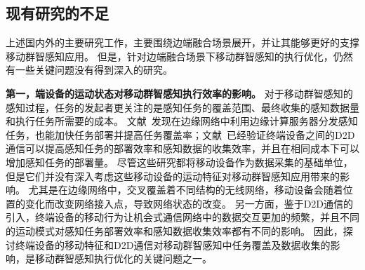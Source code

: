 

\subsection{现有研究的不足}


上述国内外的主要研究工作，主要围绕边端融合场景展开，并让其能够更好的支撑移动群智感知应用。
但是，针对边端融合场景下移动群智感知的执行优化，仍然有一些关键问题没有得到深入的研究。


\textbf{第一，端设备的运动状态对移动群智感知执行效率的影响。}
对于移动群智感知的感知过程，任务的发起者更关注的是感知任务的覆盖范围、最终收集的感知数据量和执行任务所需要的成本。
文献~发现在边缘网络中利用边缘计算服务器分发感知任务，也能加快任务部署并提高任务覆盖率；文献~已经验证终端设备之间的D2D通信可以提高感知任务的部署效率和感知数据的收集效率，并且在相同成本下可以增加感知任务的部署量。
尽管这些研究都将移动设备作为数据采集的基础单位，但是它们并没有深入考虑这些移动设备的运动特征对移动群智感知应用带来的影响。
尤其是在边缘网络中，交叉覆盖着不同结构的无线网络，移动设备会随着位置的变化而改变网络接入点，导致网络状态的改变。
另一方面，鉴于D2D通信的引入，终端设备的移动行为让机会式通信网络中的数据交互更加的频繁，并且不同的运动模式对感知任务部署效率和感知数据收集效率都有不同的影响。
因此，探讨终端设备的移动特征和D2D通信对移动群智感知中任务覆盖及数据收集的影响，是移动群智感知执行优化的关键问题之一。



